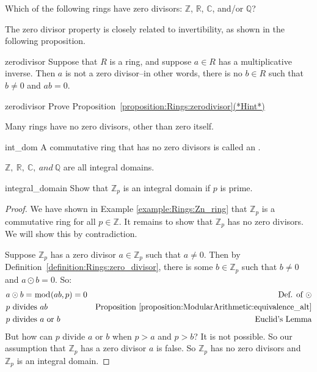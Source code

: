 \begin{exercise}{}
Which of the following rings have zero divisors: $\mathbb{Z}$, $\mathbb{R}$, $\mathbb{C}$, and/or $\mathbb{Q}$?
\end{exercise}

The zero divisor property is closely related to invertibility, as shown in the following proposition.

\begin{prop}{zerodivisor}
Suppose that $R$ is a ring, and suppose $a \in R$ has a multiplicative inverse. Then $a$ is not a zero divisor--in other words, there is no $b \in R$ such that $b\neq 0$ and $a   b = 0$.
\end{prop}

\begin{exercise}{zerodivisor}
Prove Proposition~\ref{proposition:Rings:zerodivisor}\hyperref[sec:Rings:Hints]{(*Hint*)} 
\end{exercise}

Many rings have no zero divisors, other than zero itself.

\begin{defn}{int_dom}
A commutative ring that has no zero divisors is called an .
\end{defn}

${\mathbb Z},~{\mathbb R},~{\mathbb C},~and~{\mathbb Q}$ are all integral domains.

\begin{example}{integral_domain}
Show that ${\mathbb Z}_p$ is an integral domain if $p$ is prime.

\begin{proof}
We have shown in Example \ref{example:Rings:Zn_ring} that ${\mathbb Z}_p$ is a commutative ring for all $p\in{\mathbb Z}$.  It remains to show that ${\mathbb Z}_p$ has no zero divisors.  We will show this by contradiction.

Suppose ${\mathbb Z}_p$ has a zero divisor $a\in{\mathbb Z}_p$ such that $a\neq 0$.  Then by Definition~\ref{definition:Rings:zero_divisor}, there is some $b\in{\mathbb Z}_p$ such that $b\neq 0$ and $a\odot b=0$.  So:
\begin{align*}
&a\odot b=\bmod(ab,p)=0 & \text{Def. of }\odot\\
&p \text{ divides } ab & \text{Proposition }\ref{proposition:ModularArithmetic:equivalence_alt}\\
&p \text{ divides } a \text{ or } b & \text{Euclid's Lemma}\\
\end{align*}
But how can $p$ divide $a$ or $b$ when $p>a$ and $p>b$?  It is not possible.  So our assumption that ${\mathbb Z}_p$ has a zero divisor $a$ is false.  So ${\mathbb Z}_p$ has no zero divisors and ${\mathbb Z}_p$ is an integral domain.
\end{proof}
\end{example}

